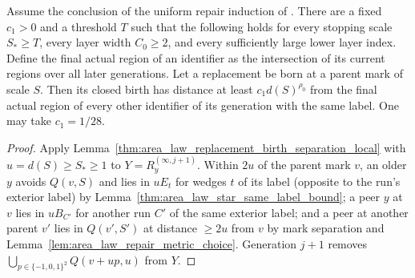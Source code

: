 \begin{lemma}
    \label{thm:area_law_replacement_birth_separation_conditional}
    \leanok
    Assume the conclusion of the uniform repair induction of
    \cite[Section~11]{OpenAI2026AreaLaw}. There are a fixed $c_1>0$ and a
    threshold $T$ such that the following holds for every stopping scale
    $S_*\ge T$, every layer width $C_0\ge2$, and every sufficiently large
    lower layer index. Define the final actual region of an identifier as
    the intersection of its current regions over all later generations. Let a
    replacement be born at a parent mark of scale $S$. Then its closed birth
    has distance at least $c_1d(S)^{\rho_0}$ from the final actual region of
    every other identifier of its generation with the same label. One may
    take $c_1=1/28$.
\end{lemma}

\begin{proof}
    \leanok
    Apply Lemma~\ref{thm:area_law_replacement_birth_separation_local} with $u=d(S)\ge S_*\ge1$
    to $Y=R_y^{(\infty,j+1)}$. Within $2u$ of the parent mark $v$, an older $y$ avoids $Q(v,S)$
    and lies in $uE_t$ for wedges $t$ of its label (opposite to the run's exterior label) by
    Lemma~\ref{thm:area_law_star_same_label_bound}; a peer $y$ at $v$ lies in $uB_{C'}$ for
    another run $C'$ of the same exterior label; and a peer at another parent $v'$ lies in
    $Q(v',S')$ at distance $\ge2u$ from $v$ by mark separation and Lemma~\ref{lem:area_law_repair_metric_choice}.
    Generation $j+1$ removes $\bigcup_{p\in\{-1,0,1\}^2}Q(v+up,u)$ from $Y$.
\end{proof}

